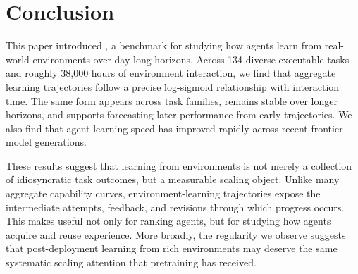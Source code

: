 \section{Conclusion}

This paper introduced \benchmark{}, a benchmark for studying how agents learn from real-world environments over day-long horizons. Across 134 diverse executable tasks and roughly 38{,}000 hours of environment interaction, we find that aggregate learning trajectories follow a precise log-sigmoid relationship with interaction time. The same form appears across task families, remains stable over longer horizons, and supports forecasting later performance from early trajectories. We also find that agent learning speed has improved rapidly across recent frontier model generations.

These results suggest that learning from environments is not merely a collection of idiosyncratic task outcomes, but a measurable scaling object. Unlike many aggregate capability curves, environment-learning trajectories expose the intermediate attempts, feedback, and revisions through which progress occurs. This makes \benchmark{} useful not only for ranking agents, but for studying how agents acquire and reuse experience. More broadly, the regularity we observe suggests that post-deployment learning from rich environments may deserve the same systematic scaling attention that pretraining has received.
